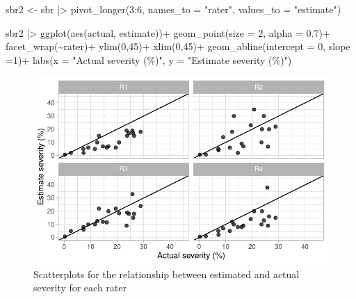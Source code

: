 \documentclass[
  letterpaper,
  DIV=11,
  numbers=noendperiod]{scrreprt}
\newenvironment{Shaded}{\begin{snugshade}}{\end{snugshade}}
\newcommand{\AttributeTok}[1]{\textcolor[rgb]{0.40,0.45,0.13}{#1}}
\newcommand{\DecValTok}[1]{\textcolor[rgb]{0.68,0.00,0.00}{#1}}
\newcommand{\FloatTok}[1]{\textcolor[rgb]{0.68,0.00,0.00}{#1}}
\newcommand{\FunctionTok}[1]{\textcolor[rgb]{0.28,0.35,0.67}{#1}}
\newcommand{\NormalTok}[1]{\textcolor[rgb]{0.00,0.23,0.31}{#1}}
\newcommand{\OtherTok}[1]{\textcolor[rgb]{0.00,0.23,0.31}{#1}}
\newcommand{\SpecialCharTok}[1]{\textcolor[rgb]{0.37,0.37,0.37}{#1}}
\newcommand{\StringTok}[1]{\textcolor[rgb]{0.13,0.47,0.30}{#1}}
\begin{document}
\begin{Shaded}
\begin{Highlighting}[]
\NormalTok{sbr2 }\OtherTok{\textless{}{-}}\NormalTok{ sbr }\SpecialCharTok{|\textgreater{}} 
  \FunctionTok{pivot\_longer}\NormalTok{(}\DecValTok{3}\SpecialCharTok{:}\DecValTok{6}\NormalTok{, }\AttributeTok{names\_to =} \StringTok{"rater"}\NormalTok{,}
               \AttributeTok{values\_to =} \StringTok{"estimate"}\NormalTok{) }

\NormalTok{sbr2 }\SpecialCharTok{|\textgreater{}} 
  \FunctionTok{ggplot}\NormalTok{(}\FunctionTok{aes}\NormalTok{(actual, estimate))}\SpecialCharTok{+}
  \FunctionTok{geom\_point}\NormalTok{(}\AttributeTok{size =} \DecValTok{2}\NormalTok{, }\AttributeTok{alpha =} \FloatTok{0.7}\NormalTok{)}\SpecialCharTok{+}
  \FunctionTok{facet\_wrap}\NormalTok{(}\SpecialCharTok{\textasciitilde{}}\NormalTok{rater)}\SpecialCharTok{+}
  \FunctionTok{ylim}\NormalTok{(}\DecValTok{0}\NormalTok{,}\DecValTok{45}\NormalTok{)}\SpecialCharTok{+}
  \FunctionTok{xlim}\NormalTok{(}\DecValTok{0}\NormalTok{,}\DecValTok{45}\NormalTok{)}\SpecialCharTok{+}
  \FunctionTok{geom\_abline}\NormalTok{(}\AttributeTok{intercept =} \DecValTok{0}\NormalTok{, }\AttributeTok{slope =}\DecValTok{1}\NormalTok{)}\SpecialCharTok{+}
  \FunctionTok{labs}\NormalTok{(}\AttributeTok{x =} \StringTok{"Actual severity (\%)"}\NormalTok{,}
       \AttributeTok{y =} \StringTok{"Estimate severity (\%)"}\NormalTok{)}
\end{Highlighting}
\end{Shaded}

\begin{figure}[H]

{\centering \includegraphics{./data-accuracy_files/figure-pdf/fig-scater-1.pdf}

}

\caption{\label{fig-scater}Scatterplots for the relationship between
estimated and actual severity for each rater}

\end{figure}
\end{document}
